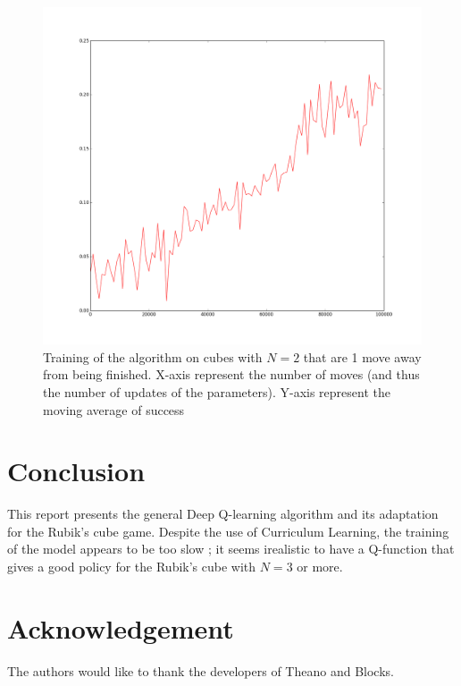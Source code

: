 \documentclass{article} %
\begin{document}
\begin{figure}[h]
\begin{center}
   \caption{\label{firstfigure} Training of the algorithm on cubes with $N=2$ that are 1 move away from being finished. X-axis represent the number of moves (and thus the number of updates of the parameters). Y-axis represent the moving average of success}
   \includegraphics[scale=0.4]{firstfigure.png}
\end{center}
\end{figure}

\section{Conclusion}
This report presents the general Deep Q-learning algorithm and its adaptation for the Rubik's cube game. Despite the use of Curriculum Learning, the training of the model appears to be too slow ; it seems irealistic to have a Q-function that gives a good policy for the Rubik's cube with $N=3$ or more.

\section{Acknowledgement}
The authors would like to thank the developers of Theano and Blocks.




\end{document}
